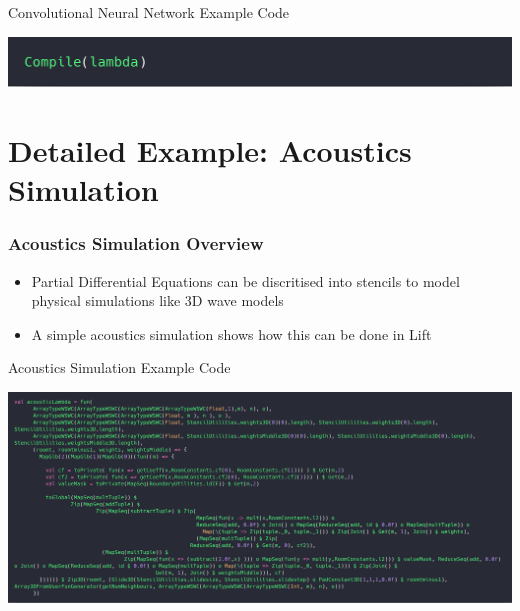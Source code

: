 \documentclass[10pt]{beamer}
\begin{document}
\begin{frame}{Convolutional Neural Network Example Code}
        \begin{block}{}
        \begin{center}
            \includegraphics[width=.5\textwidth]{../images/simpleCompile.png}
        \end{center}
        \end{block}
\end{frame}


\section{Detailed Example: Acoustics Simulation }

\begin{frame}
\frametitle{Acoustics Simulation Overview}
\vspace{.2cm}
\begin{itemize}
    \item Partial Differential Equations can be discritised into stencils to model physical simulations like 3D wave models 
    \item A simple acoustics simulation shows how this can be done in Lift 
\end{itemize}
\vspace{-1.2cm}
\end{frame}

\begin{frame}{Acoustics Simulation Example Code}
        \begin{block}{}
        \begin{center}
            \includegraphics[width=\textwidth]{../images/acousticLambda.png}
        \end{center}
        \end{block}
\end{frame}


\appendix
\end{document}
